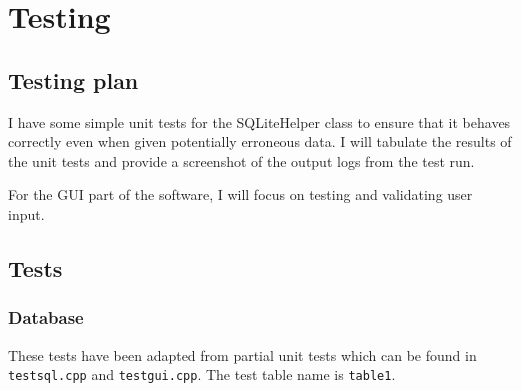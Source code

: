 \section{Testing}
\subsection{Testing plan}

I have some simple unit tests for the SQLiteHelper class to ensure that it
behaves correctly even when given potentially erroneous data. I will tabulate
the results of the unit tests and provide a screenshot of the output logs from
the test run.

For the GUI part of the software, I will focus on testing and validating user
input.


\subsection{Tests}
\subsubsection{Database}

These tests have been adapted from partial unit tests which can be found in
\texttt{testsql.cpp} and \texttt{testgui.cpp}. The test table name is
\texttt{table1}.

